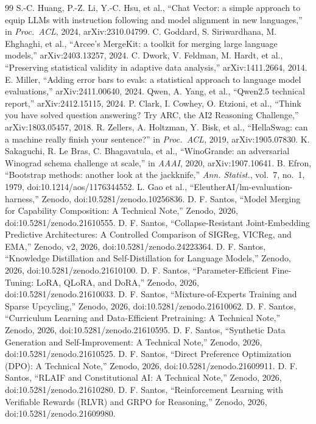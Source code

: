 \documentclass[conference]{IEEEtran}
\begin{document}
\begin{thebibliography}{99}
 S.-C. Huang, P.-Z. Li, Y.-C. Hsu, et al., ``Chat Vector: a simple approach to equip LLMs with instruction following and model alignment in new languages,'' in \emph{Proc.\ ACL}, 2024, arXiv:2310.04799.
 C. Goddard, S. Siriwardhana, M. Ehghaghi, et al., ``Arcee's MergeKit: a toolkit for merging large language models,'' arXiv:2403.13257, 2024.
 C. Dwork, V. Feldman, M. Hardt, et al., ``Preserving statistical validity in adaptive data analysis,'' arXiv:1411.2664, 2014.
 E. Miller, ``Adding error bars to evals: a statistical approach to language model evaluations,'' arXiv:2411.00640, 2024.
 Qwen, A. Yang, et al., ``Qwen2.5 technical report,'' arXiv:2412.15115, 2024.
 P. Clark, I. Cowhey, O. Etzioni, et al., ``Think you have solved question answering? Try ARC, the AI2 Reasoning Challenge,'' arXiv:1803.05457, 2018.
 R. Zellers, A. Holtzman, Y. Bisk, et al., ``HellaSwag: can a machine really finish your sentence?'' in \emph{Proc.\ ACL}, 2019, arXiv:1905.07830.
 K. Sakaguchi, R. Le Bras, C. Bhagavatula, et al., ``WinoGrande: an adversarial Winograd schema challenge at scale,'' in \emph{AAAI}, 2020, arXiv:1907.10641.
 B. Efron, ``Bootstrap methods: another look at the jackknife,'' \emph{Ann. Statist.}, vol.~7, no.~1, 1979, doi:10.1214/aos/1176344552.
 L. Gao et al., ``EleutherAI/lm-evaluation-harness,'' Zenodo, doi:10.5281/zenodo.10256836.
 D. F. Santos, ``Model Merging for Capability Composition: A Technical Note,'' Zenodo, 2026, doi:10.5281/zenodo.21610555.
 D. F. Santos, ``Collapse-Resistant Joint-Embedding Predictive Architectures: A Controlled Comparison of SIGReg, VICReg, and EMA,'' Zenodo, v2, 2026, doi:10.5281/zenodo.24223364.
 D. F. Santos, ``Knowledge Distillation and Self-Distillation for Language Models,'' Zenodo, 2026, doi:10.5281/zenodo.21610100.
 D. F. Santos, ``Parameter-Efficient Fine-Tuning: LoRA, QLoRA, and DoRA,'' Zenodo, 2026, doi:10.5281/zenodo.21610033.
 D. F. Santos, ``Mixture-of-Experts Training and Sparse Upcycling,'' Zenodo, 2026, doi:10.5281/zenodo.21610062.
 D. F. Santos, ``Curriculum Learning and Data-Efficient Pretraining: A Technical Note,'' Zenodo, 2026, doi:10.5281/zenodo.21610595.
 D. F. Santos, ``Synthetic Data Generation and Self-Improvement: A Technical Note,'' Zenodo, 2026, doi:10.5281/zenodo.21610525.
 D. F. Santos, ``Direct Preference Optimization (DPO): A Technical Note,'' Zenodo, 2026, doi:10.5281/zenodo.21609911.
 D. F. Santos, ``RLAIF and Constitutional AI: A Technical Note,'' Zenodo, 2026, doi:10.5281/zenodo.21610280.
 D. F. Santos, ``Reinforcement Learning with Verifiable Rewards (RLVR) and GRPO for Reasoning,'' Zenodo, 2026, doi:10.5281/zenodo.21609980.
\end{thebibliography}
\end{document}
